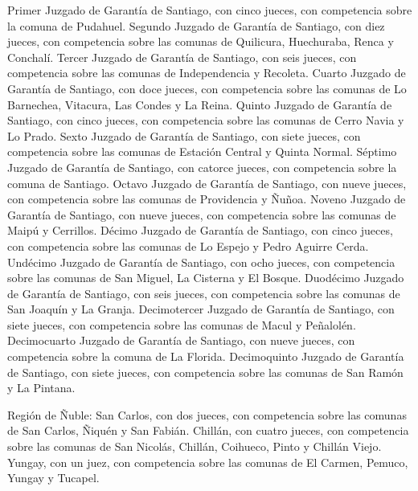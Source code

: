     Primer Juzgado de Garantía de Santiago, con cinco jueces, con competencia sobre la comuna de Pudahuel.
    Segundo Juzgado de Garantía de Santiago, con diez jueces, con competencia sobre las comunas de Quilicura, Huechuraba, Renca y Conchalí.
    Tercer Juzgado de Garantía de Santiago, con seis jueces, con competencia sobre las comunas de Independencia y Recoleta.
    Cuarto Juzgado de Garantía de Santiago, con doce jueces, con competencia sobre las comunas de Lo Barnechea, Vitacura, Las Condes y La Reina.
    Quinto Juzgado de Garantía de Santiago, con cinco jueces, con competencia sobre las comunas de Cerro Navia y Lo Prado.
    Sexto Juzgado de Garantía de Santiago, con siete jueces, con competencia sobre las comunas de Estación Central y Quinta Normal.
    Séptimo Juzgado de Garantía de Santiago, con catorce jueces, con competencia sobre la comuna de Santiago.
    Octavo Juzgado de Garantía de Santiago, con nueve jueces, con competencia sobre las comunas de Providencia y Ñuñoa.
    Noveno Juzgado de Garantía de Santiago, con nueve jueces, con competencia sobre las comunas de Maipú y Cerrillos.
    Décimo Juzgado de Garantía de Santiago, con cinco jueces, con competencia sobre las comunas de Lo Espejo y Pedro Aguirre Cerda.
    Undécimo Juzgado de Garantía de Santiago, con ocho jueces, con competencia sobre las comunas de San Miguel, La Cisterna y El Bosque.
    Duodécimo Juzgado de Garantía de Santiago, con seis jueces, con competencia sobre las comunas de San Joaquín y La Granja.
    Decimotercer Juzgado de Garantía de Santiago, con siete jueces, con competencia sobre las comunas de Macul y Peñalolén.
    Decimocuarto Juzgado de Garantía de Santiago, con nueve jueces, con competencia sobre la comuna de La Florida.
    Decimoquinto Juzgado de Garantía de Santiago, con siete jueces, con competencia sobre las comunas de San Ramón y La Pintana.

    Región de Ñuble:
    San Carlos, con dos jueces, con competencia sobre las comunas de San Carlos, Ñiquén y San Fabián.
    Chillán, con cuatro jueces, con competencia sobre las comunas de San Nicolás, Chillán, Coihueco, Pinto y Chillán Viejo.
    Yungay, con un juez, con competencia sobre las comunas de El Carmen, Pemuco, Yungay y Tucapel.


